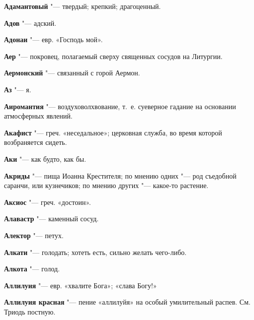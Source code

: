 \begin{mymulticols}{2}
\noindent\textbf{Адамантовый} "--- твердый; крепкий; драгоценный. 




\noindent\textbf{Адов} "--- адский. 




\noindent\textbf{Адонаи} "--- евр. «Господь мой». 




\noindent\textbf{Аер} "--- покровец, полагаемый сверху священных сосудов на Литургии. 




\noindent\textbf{Аермонский} "--- связанный с горой Аермон. 




\noindent\textbf{Аз} "--- я. 




\noindent\textbf{Аиромантия} "--- воздуховолхвование, т.~е. суеверное гадание на основании атмосферных явлений. 




\noindent\textbf{Акафист} "--- греч. «неседальное»; церковная служба, во время которой возбраняется сидеть. 




\noindent\textbf{Аки} "--- как будто, как бы. 




\noindent\textbf{Акриды} "--- пища Иоанна Крестителя; по мнению одних "--- род съедобной саранчи, или кузнечиков; по мнению других "--- какое-то растение. 




\noindent\textbf{Аксиос} "--- греч. «достоин». 




\noindent\textbf{Алавастр} "--- каменный сосуд. 




\noindent\textbf{Алектор} "--- петух. 




\noindent\textbf{Алкати} "--- голодать; хотеть есть, сильно желать чего-либо. 




\noindent\textbf{Алкота} "--- голод. 




\noindent\textbf{Аллилуия} "--- евр. «хвалите Бога»; «слава Богу!» 




\noindent\textbf{Аллилуия красная} "--- пение «аллилуйя» на особый умилительный распев. См. Триодь постную. 





\end{mymulticols}
